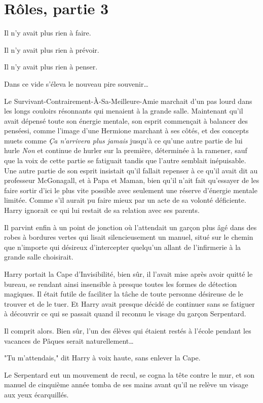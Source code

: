 
\chapter{Rôles, partie 3}

Il n'y avait plus rien à faire.

Il n'y avait plus rien à prévoir.

Il n'y avait plus rien à penser.

Dans ce vide s'éleva le nouveau pire souvenir…

Le Survivant-Contrairement-À-Sa-Meilleure-Amie marchait d'un pas lourd dans les longs couloirs résonnants qui menaient à la grande salle. Maintenant qu'il avait dépensé toute son énergie mentale, son esprit commençait à balancer des penséesi, comme l'image d'une Hermione marchant à ses côtés, et des concepts muets comme \emph{Ça n'arrivera plus jamais}  jusqu'à ce qu'une autre partie de lui hurle \emph{Non}  et continue de hurler sur la première, déterminée à la ramener, sauf que la voix de cette partie se fatiguait tandis que l'autre semblait inépuisable. Une autre partie de son esprit insistait qu'il fallait repenser à ce qu'il avait dit au professeur McGonagall, et à Papa et Maman, bien qu'il n'ait fait qu'essayer de les faire sortir d'ici le plus vite possible avec seulement une réserve d'énergie mentale limitée. Comme s'il aurait pu faire mieux par un acte de sa volonté déficiente. Harry ignorait ce qui lui restait de sa relation avec ses parents.

Il parvint enfin à un point de jonction où l'attendait un garçon plus âgé dans des robes à bordures vertes qui lisait silencieusement un manuel, situé sur le chemin que n'importe qui désireux d'intercepter quelqu'un allant de l'infirmerie à la grande salle choisirait.

Harry portait la Cape d'Invisibilité, bien sûr, il l'avait mise après avoir quitté le bureau, se rendant ainsi insensible à presque toutes les formes de détection magiques. Il était futile de faciliter la tâche de toute personne désireuse de le trouver et de le tuer. Et Harry avait presque décidé de continuer sans se fatiguer à découvrir ce qui se passait quand il reconnu le visage du garçon Serpentard.

Il comprit alors. Bien sûr, l'un des élèves qui étaient restés à l'école pendant les vacances de Pâques serait naturellement…

"Tu m'attendais," dit Harry à voix haute, sans enlever la Cape.

Le Serpentard eut un mouvement de recul, se cogna la tête contre le mur, et son manuel de cinquième année tomba de ses mains avant qu'il ne relève un visage aux yeux écarquillés.

